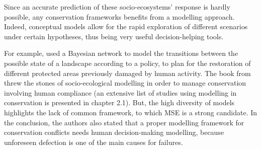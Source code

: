 \documentclass[12pt,a4paper]{article}
\begin{document}
Since an accurate prediction of these socio-ecosystems' response is hardly possible, any conservation frameworks benefits from a modelling approach. %
Indeed, conceptual models allow for the rapid exploration of different scenarios under certain hypotheses, thus being very useful decision-helping tools. %
%

For example, \cite{rumpff2011state} used a Bayesian network to model the transitions between the possible state of a landscape according to a policy, to plan for the restoration of different protected areas previously damaged by human activity. %
The book from \cite{schluter2012new} threw the stones of socio-ecological modelling in order to manage conservation involving human compliance (an extensive list of studies using modelling in conservation is presented in chapter 2.1).
But, the high diversity of models highlights the lack of common framework, to which MSE is a strong candidate. %
In the conclusion, the authors also stated that a proper modelling framework for conservation conflicts needs human decision-making modelling, because unforeseen defection is one of the main causes for failures.\\
%
\end{document}
